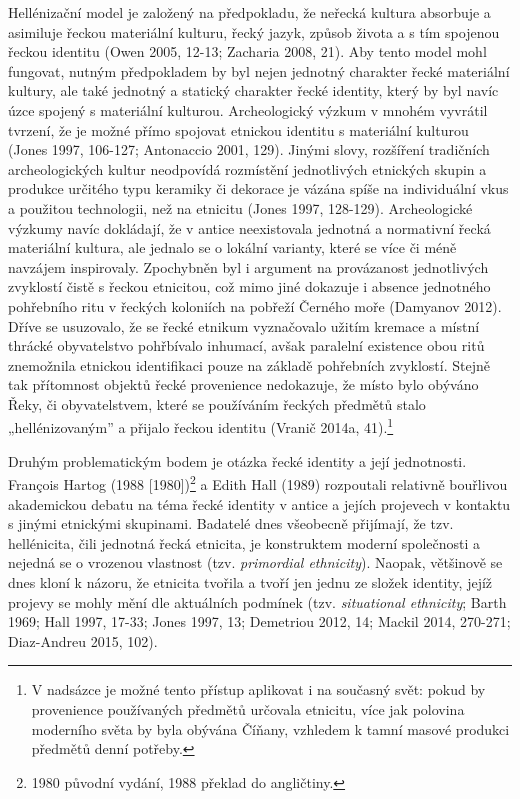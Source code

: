 Hellénizační model je založený na předpokladu, že neřecká kultura absorbuje a asimiluje řeckou materiální kulturu, řecký jazyk, způsob života a s tím spojenou řeckou identitu (Owen 2005, 12-13; Zacharia 2008, 21). Aby tento model mohl fungovat, nutným předpokladem by byl nejen jednotný charakter řecké materiální kultury, ale také jednotný a statický charakter řecké identity, který by byl navíc úzce spojený s materiální kulturou. Archeologický výzkum v mnohém vyvrátil tvrzení, že je možné přímo spojovat etnickou identitu s materiální kulturou (Jones 1997, 106-127; Antonaccio 2001, 129). Jinými slovy, rozšíření tradičních archeologických kultur neodpovídá rozmístění jednotlivých etnických skupin a produkce určitého typu keramiky či dekorace je vázána spíše na individuální vkus a použitou technologii, než na etnicitu (Jones 1997, 128-129). Archeologické výzkumy navíc dokládají, že v antice neexistovala jednotná a normativní řecká materiální kultura, ale jednalo se o lokální varianty, které se více či méně navzájem inspirovaly. Zpochybněn byl i argument na provázanost jednotlivých zvyklostí čistě s řeckou etnicitou, což mimo jiné dokazuje i absence jednotného pohřebního ritu v řeckých koloniích na pobřeží Černého moře (Damyanov 2012). Dříve se usuzovalo, že se řecké etnikum vyznačovalo užitím kremace a místní thrácké obyvatelstvo pohřbívalo inhumací, avšak paralelní existence obou ritů znemožnila etnickou identifikaci pouze na základě pohřebních zvyklostí. Stejně tak přítomnost objektů řecké provenience nedokazuje, že místo bylo obýváno Řeky, či obyvatelstvem, které se používáním řeckých předmětů stalo „hellénizovaným” a přijalo řeckou identitu (Vranič 2014a, 41).\footnote{V nadsázce je možné tento přístup aplikovat i na současný svět: pokud by provenience používaných předmětů určovala etnicitu, více jak polovina moderního světa by byla obývána Číňany, vzhledem k tamní masové produkci předmětů denní potřeby.}

Druhým problematickým bodem je otázka řecké identity a její jednotnosti. François Hartog (1988 {[}1980{]})\footnote{1980 původní vydání, 1988 překlad do angličtiny.} a Edith Hall (1989) rozpoutali relativně bouřlivou akademickou debatu na téma řecké identity v antice a jejích projevech v kontaktu s jinými etnickými skupinami. Badatelé dnes všeobecně přijímají, že tzv. hellénicita, čili jednotná řecká etnicita, je konstruktem moderní společnosti a nejedná se o vrozenou vlastnost (tzv. {\em primordial ethnicity}). Naopak, většinově se dnes kloní k názoru, že etnicita tvořila a tvoří jen jednu ze složek identity, jejíž projevy se mohly mění dle aktuálních podmínek (tzv. {\em situational ethnicity}; Barth 1969; Hall 1997, 17-33; Jones 1997, 13; Demetriou 2012, 14; Mackil 2014, 270-271; Diaz-Andreu 2015, 102).

